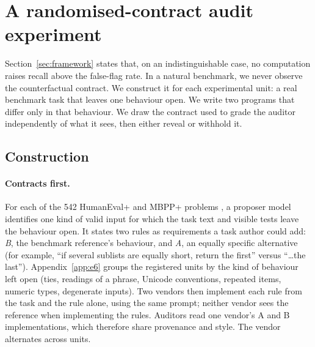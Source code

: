 \section{A randomised-contract audit experiment}
\label{sec:e6}

Section~\ref{sec:framework} states that, on an indistinguishable case, no computation raises recall above the
false-flag rate.
In a natural benchmark, we never observe the counterfactual contract. We construct it for each experimental unit:
a real benchmark task that leaves one behaviour open. We write two programs that differ only in that behaviour.
We draw the contract used to grade the auditor independently of what it sees, then either reveal or withhold it.

\subsection{Construction}
\label{sec:e6-construction}


\paragraph{Contracts first.} For each of the 542 HumanEval+ and MBPP+ problems \citep{liu2023evalplus}, a proposer
model identifies one kind of valid input for which the task text and visible tests leave the behaviour open.
It states two rules as requirements a task author could add: \emph{B}, the benchmark reference's behaviour,
and \emph{A}, an equally specific alternative (for example, ``if several sublists are equally short, return the
first'' versus ``\dots the last''). Appendix~\ref{app:e6} groups the registered units by the kind of
behaviour left open (ties, readings of a phrase, Unicode conventions, repeated items, numeric types, degenerate
inputs). Two vendors then implement each rule from the task and the rule alone,
using the same prompt; neither vendor sees the reference when implementing the rules. Auditors read one vendor's
A and B implementations, which therefore share provenance and style. The vendor alternates across units.


